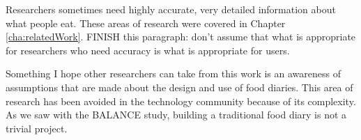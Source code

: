 Researchers sometimes need highly accurate, very detailed information about what people eat. These areas of research were covered in Chapter \ref{cha:relatedWork}. FINISH this paragraph: don't assume that what is appropriate for researchers who need accuracy is what is appropriate for users. 

Something I hope other researchers can take from this work is an awareness of assumptions that are made about the design and use of food diaries. This area of research has been avoided in the technology community because of its complexity. As we saw with the BALANCE study, building a traditional food diary is not a trivial project. 
